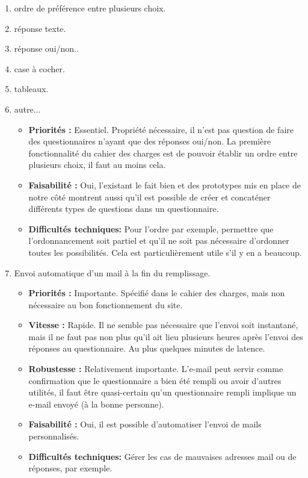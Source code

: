 \documentclass{article}
\begin{document}
\begin{enumerate}[noitemsep]
    \item ordre de préférence entre plusieurs choix.
    \item réponse texte.
    \item réponse oui/non..
    \item case à cocher.
    \item tableaux.
    \item autre...

\begin{itemize}[noitemsep]
    \item \textbf{Priorités : }Essentiel. Propriété nécessaire, il n'est pas question de faire des questionnaires n'ayant que des réponses oui/non. La première fonctionnalité du cahier des charges est de pouvoir établir un ordre entre plusieurs choix, il faut au moins cela.
    \item \textbf{Faisabilité : }Oui, l'existant le fait bien et des prototypes mis en place de notre côté montrent aussi qu'il est possible de créer et concaténer différents types de questions dans un questionnaire.
    \item \textbf{Difficultés techniques: }Pour l'ordre par exemple, permettre que l'ordonnancement soit partiel et qu'il ne soit pas nécessaire d'ordonner toutes les possibilités. Cela est particulièrement utile s'il y en a beaucoup.
\end{itemize}
\item Envoi automatique d'un mail à la fin du remplissage.
\begin{itemize}[noitemsep]
    \item \textbf{Priorités : }Importante. Spécifié dans le cahier des charges, mais non nécessaire au bon fonctionnement du site.
    \item \textbf{Vitesse : }Rapide. Il ne semble pas nécessaire que l'envoi soit instantané, mais il ne faut pas non plus qu'il ait lieu plusieurs heures après l'envoi des réponses au questionnaire. Au plus quelques minutes de latence.
    \item \textbf{Robustesse : }Relativement importante. L'e-mail peut servir comme confirmation que le questionnaire a bien été rempli ou avoir d'autres utilités, il faut être quasi-certain qu'un questionnaire rempli implique un e-mail envoyé (à la bonne personne).
    \item \textbf{Faisabilité : }Oui, il est possible d'automatiser l'envoi de mails personnalisés.
    \item \textbf{Difficultés techniques: } Gérer les cas de mauvaises adresses mail ou de réponses, par exemple.

\end{itemize}
\end{enumerate}
\end{document}
